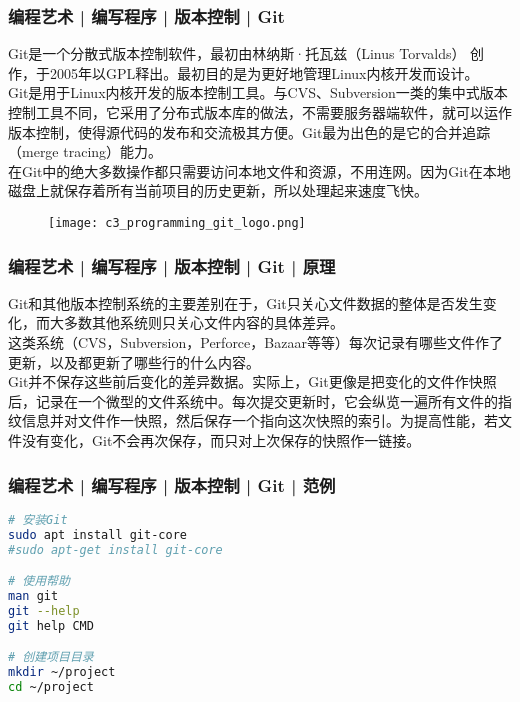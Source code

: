 \begin{frame}
  \frametitle{编程艺术 | 编写程序 | 版本控制 | \alert{Git}}
  Git是一个\alert{分散式版本控制软件}，最初由\alert{林纳斯·托瓦兹（Linus Torvalds）} 创作，于2005年以GPL释出。最初目的是为更好地管理Linux内核开发而设计。\\
  \vspace{0.5em}
Git是用于Linux内核开发的版本控制工具。与CVS、Subversion一类的集中式版本控制工具不同，它采用了\alert{分布式版本库}的做法，不需要服务器端软件，就可以运作版本控制，使得源代码的发布和交流极其方便。Git最为出色的是它的合并追踪（merge tracing）能力。\\
\vspace{0.5em}
在Git中的绝大多数操作都只需要访问本地文件和资源，不用连网。因为Git在本地磁盘上就保存着所有当前项目的历史更新，所以处理起来速度飞快。
\begin{figure}
  \centering
  \texttt{[image: c3\_programming\_git\_logo.png]}
\end{figure}
\end{frame}

\begin{frame}
  \frametitle{编程艺术 | 编写程序 | 版本控制 | Git | 原理}
Git和其他版本控制系统的主要差别在于，Git只关心文件数据的整体是否发生变化，而大多数其他系统则只关心文件内容的具体差异。\\
  \vspace{1em}
  这类系统（CVS，Subversion，Perforce，Bazaar等等）每次记录有哪些文件作了更新，以及都更新了哪些行的什么内容。\\
  \vspace{1em}
  Git并不保存这些前后变化的差异数据。实际上，Git更像是把变化的文件作快照后，记录在一个微型的文件系统中。每次提交更新时，它会纵览一遍所有文件的指纹信息并对文件作一快照，然后保存一个指向这次快照的索引。为提高性能，若文件没有变化，Git不会再次保存，而只对上次保存的快照作一链接。
\end{frame}

\begin{frame}[fragile]
  \frametitle{编程艺术 | 编写程序 | 版本控制 | Git | \alert{范例}}
\begin{lstlisting}[language=sh]
# 安装Git
sudo apt install git-core
#sudo apt-get install git-core

# 使用帮助
man git
git --help
git help CMD

# 创建项目目录
mkdir ~/project
cd ~/project
\end{lstlisting}
\end{frame}

